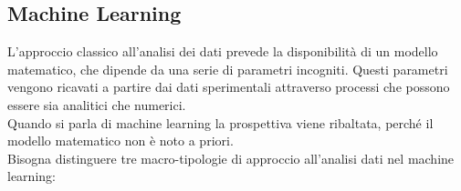  
  
	
\newpage
	
\subsection{Machine Learning}
\label{subsec:machine learning}
	L'approccio classico all'analisi dei dati prevede la disponibilità di un modello matematico, che dipende da una serie di parametri incogniti. Questi parametri vengono ricavati a partire dai dati sperimentali attraverso processi che possono essere sia analitici che numerici. \\
	Quando si parla di machine learning la prospettiva viene ribaltata, perché il modello matematico non è noto a priori. \\
	Bisogna distinguere tre macro-tipologie di approccio all'analisi dati nel machine learning:
